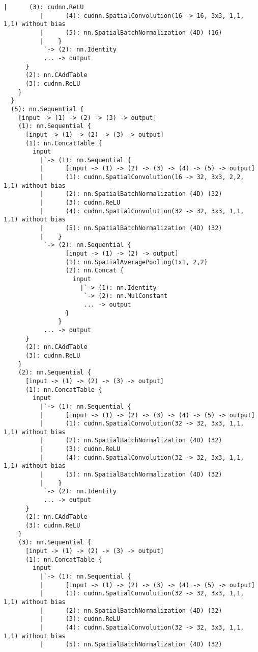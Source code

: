 \begin{lstlisting}[language={[5.2]Lua}]
          |      (3): cudnn.ReLU
          |      (4): cudnn.SpatialConvolution(16 -> 16, 3x3, 1,1, 1,1) without bias
          |      (5): nn.SpatialBatchNormalization (4D) (16)
          |    }
           `-> (2): nn.Identity
           ... -> output
      }
      (2): nn.CAddTable
      (3): cudnn.ReLU
    }
  }
  (5): nn.Sequential {
    [input -> (1) -> (2) -> (3) -> output]
    (1): nn.Sequential {
      [input -> (1) -> (2) -> (3) -> output]
      (1): nn.ConcatTable {
        input
          |`-> (1): nn.Sequential {
          |      [input -> (1) -> (2) -> (3) -> (4) -> (5) -> output]
          |      (1): cudnn.SpatialConvolution(16 -> 32, 3x3, 2,2, 1,1) without bias
          |      (2): nn.SpatialBatchNormalization (4D) (32)
          |      (3): cudnn.ReLU
          |      (4): cudnn.SpatialConvolution(32 -> 32, 3x3, 1,1, 1,1) without bias
          |      (5): nn.SpatialBatchNormalization (4D) (32)
          |    }
           `-> (2): nn.Sequential {
                 [input -> (1) -> (2) -> output]
                 (1): nn.SpatialAveragePooling(1x1, 2,2)
                 (2): nn.Concat {
                   input
                     |`-> (1): nn.Identity
                      `-> (2): nn.MulConstant
                      ... -> output
                 }
               }
           ... -> output
      }
      (2): nn.CAddTable
      (3): cudnn.ReLU
    }
    (2): nn.Sequential {
      [input -> (1) -> (2) -> (3) -> output]
      (1): nn.ConcatTable {
        input
          |`-> (1): nn.Sequential {
          |      [input -> (1) -> (2) -> (3) -> (4) -> (5) -> output]
          |      (1): cudnn.SpatialConvolution(32 -> 32, 3x3, 1,1, 1,1) without bias
          |      (2): nn.SpatialBatchNormalization (4D) (32)
          |      (3): cudnn.ReLU
          |      (4): cudnn.SpatialConvolution(32 -> 32, 3x3, 1,1, 1,1) without bias
          |      (5): nn.SpatialBatchNormalization (4D) (32)
          |    }
           `-> (2): nn.Identity
           ... -> output
      }
      (2): nn.CAddTable
      (3): cudnn.ReLU
    }
    (3): nn.Sequential {
      [input -> (1) -> (2) -> (3) -> output]
      (1): nn.ConcatTable {
        input
          |`-> (1): nn.Sequential {
          |      [input -> (1) -> (2) -> (3) -> (4) -> (5) -> output]
          |      (1): cudnn.SpatialConvolution(32 -> 32, 3x3, 1,1, 1,1) without bias
          |      (2): nn.SpatialBatchNormalization (4D) (32)
          |      (3): cudnn.ReLU
          |      (4): cudnn.SpatialConvolution(32 -> 32, 3x3, 1,1, 1,1) without bias
          |      (5): nn.SpatialBatchNormalization (4D) (32)

\end{lstlisting}
